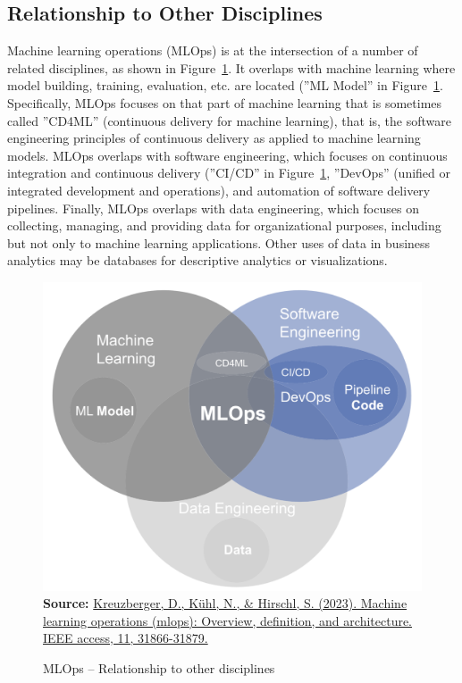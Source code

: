 \subsection*{Relationship to Other Disciplines}

Machine learning operations (MLOps) is at the intersection of a number of related disciplines, as shown in Figure~\ref{fig:mlopsrelationships}. It overlaps with machine learning where model building, training, evaluation, etc. are located (''ML Model'' in Figure~\ref{fig:mlopsrelationships}. Specifically, MLOps focuses on that part of machine learning that is sometimes called ''CD4ML'' (continuous delivery for machine learning), that is, the software engineering principles of continuous delivery as applied to machine learning models. MLOps overlaps with software engineering, which focuses on continuous integration and continuous delivery (''CI/CD'' in Figure~\ref{fig:mlopsrelationships}, ''DevOps'' (unified or integrated development and operations), and automation of software delivery pipelines. Finally, MLOps overlaps with data engineering, which focuses on collecting, managing, and providing data for organizational purposes, including but not only to machine learning applications. Other uses of data in business analytics may be databases for descriptive analytics or visualizations. 

\begin{figure}
\centering
\includegraphics[width=.75\textwidth]{Kreuzbergeretal_fig5.png} \\
\scriptsize \textbf{Source:} \href{https://ieeexplore.ieee.org/abstract/document/10081336}{Kreuzberger, D., K\"uhl, N., \& Hirschl, S. (2023). Machine learning operations (mlops): Overview, definition, and architecture. IEEE access, 11, 31866-31879.}
\caption{MLOps -- Relationship to other disciplines}
\label{fig:mlopsrelationships}
\end{figure}

